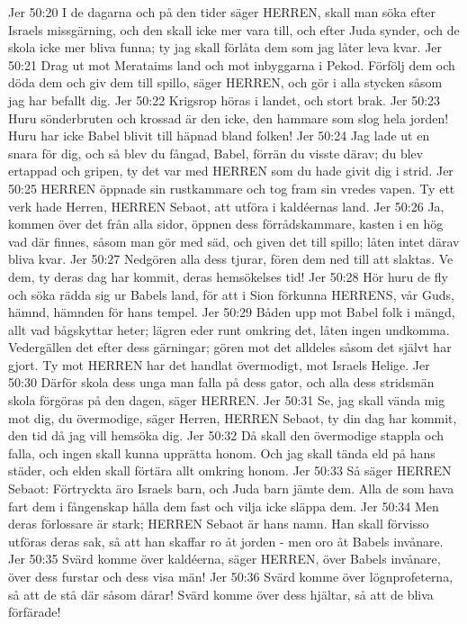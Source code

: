 Jer 50:20  I de dagarna och på den tider säger HERREN, skall man söka efter Israels missgärning, och den skall icke mer vara till, och efter Juda synder, och de skola icke mer bliva funna; ty jag skall förlåta dem som jag låter leva kvar.
Jer 50:21  Drag ut mot Merataims land och mot inbyggarna i Pekod. Förfölj dem och döda dem och giv dem till spillo, säger HERREN, och gör i alla stycken såsom jag har befallt dig.
Jer 50:22  Krigsrop höras i landet, och stort brak.
Jer 50:23  Huru sönderbruten och krossad är den icke, den hammare som slog hela jorden! Huru har icke Babel blivit till häpnad bland folken!
Jer 50:24  Jag lade ut en snara för dig, och så blev du fångad, Babel, förrän du visste därav; du blev ertappad och gripen, ty det var med HERREN som du hade givit dig i strid.
Jer 50:25  HERREN öppnade sin rustkammare och tog fram sin vredes vapen. Ty ett verk hade Herren, HERREN Sebaot, att utföra i kaldéernas land.
Jer 50:26  Ja, kommen över det från alla sidor, öppnen dess förrådskammare, kasten i en hög vad där finnes, såsom man gör med säd, och given det till spillo; låten intet därav bliva kvar.
Jer 50:27  Nedgören alla dess tjurar, fören dem ned till att slaktas. Ve dem, ty deras dag har kommit, deras hemsökelses tid!
Jer 50:28  Hör huru de fly och söka rädda sig ur Babels land, för att i Sion förkunna HERRENS, vår Guds, hämnd, hämnden för hans tempel.
Jer 50:29  Båden upp mot Babel folk i mängd, allt vad bågskyttar heter; lägren eder runt omkring det, låten ingen undkomma. Vedergällen det efter dess gärningar; gören mot det alldeles såsom det självt har gjort. Ty mot HERREN har det handlat övermodigt, mot Israels Helige.
Jer 50:30  Därför skola dess unga man falla på dess gator, och alla dess stridsmän skola förgöras på den dagen, säger HERREN.
Jer 50:31  Se, jag skall vända mig mot dig, du övermodige, säger Herren, HERREN Sebaot, ty din dag har kommit, den tid då jag vill hemsöka dig.
Jer 50:32  Då skall den övermodige stappla och falla, och ingen skall kunna upprätta honom. Och jag skall tända eld på hans städer, och elden skall förtära allt omkring honom.
Jer 50:33  Så säger HERREN Sebaot: Förtryckta äro Israels barn, och Juda barn jämte dem. Alla de som hava fart dem i fångenskap hålla dem fast och vilja icke släppa dem.
Jer 50:34  Men deras förlossare är stark; HERREN Sebaot är hans namn. Han skall förvisso utföras deras sak, så att han skaffar ro åt jorden - men oro åt Babels invånare.
Jer 50:35  Svärd komme över kaldéerna, säger HERREN, över Babels invånare, över dess furstar och dess visa män!
Jer 50:36  Svärd komme över lögnprofeterna, så att de stå där såsom dårar! Svärd komme över dess hjältar, så att de bliva förfärade!
